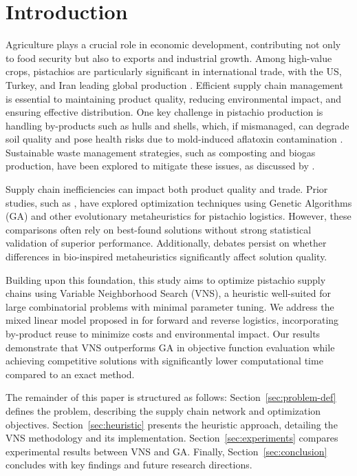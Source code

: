 \documentclass[a4paper]{ifacconf}
\begin{document}
\section{Introduction}
\label{sec:intro}
Agriculture plays a crucial role in economic development, contributing not only to food security but also to exports and industrial growth. Among high-value crops, 
pistachios are particularly significant in international trade, with the US, Turkey, and Iran leading global production \citep{statista2023pistachio}. Efficient supply chain management is essential 
to maintaining product quality, reducing environmental impact, and ensuring effective distribution. One key challenge in pistachio production is handling by-products 
such as hulls and shells, which, if mismanaged, can degrade soil quality and pose health risks due to mold-induced aflatoxin contamination \citep{dronavalli2019}. 
Sustainable waste management strategies, such as composting and biogas production, have been explored to mitigate these issues, as discussed by \cite{cheraghalipour2022bi}.

Supply chain inefficiencies can impact both product quality and trade. Prior studies, such as \cite{rajabi2023utilizing}, have explored optimization 
techniques using Genetic Algorithms (GA) and other evolutionary metaheuristics for pistachio logistics. However, these comparisons often rely on best-found solutions without 
strong statistical validation of superior performance. Additionally, debates persist on whether differences in bio-inspired metaheuristics significantly affect solution quality.

Building upon this foundation, this study aims to optimize pistachio supply chains using Variable Neighborhood Search (VNS), a heuristic well-suited for large 
combinatorial problems with minimal parameter tuning. We address the mixed linear model proposed in \cite{rajabi2023utilizing} for forward and reverse logistics, 
incorporating by-product reuse to minimize costs and environmental impact. Our results demonstrate that VNS outperforms GA in objective function evaluation while 
achieving competitive solutions with significantly lower computational time compared to an exact method.

The remainder of this paper is structured as follows: Section~\ref{sec:problem-def} defines the problem, describing the supply chain network and optimization objectives. Section~\ref{sec:heuristic} presents 
the heuristic approach, detailing the VNS methodology and its implementation. Section~\ref{sec:experiments} compares experimental results between VNS and GA. Finally, Section~\ref{sec:conclusion}
concludes with key findings and future research directions.
\end{document}
